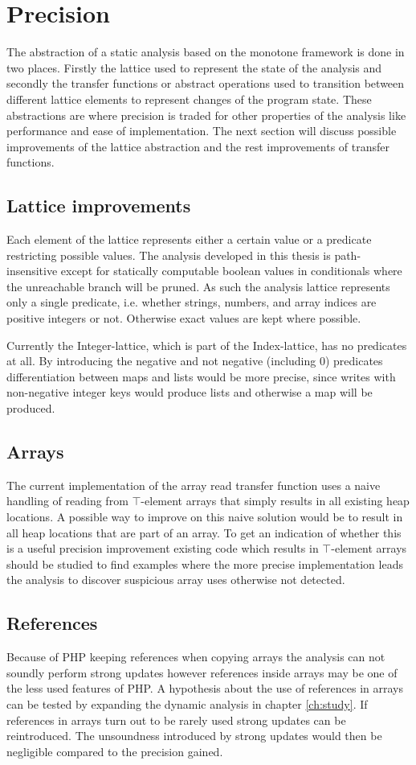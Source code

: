 \section{Precision}
\label{sec:future2}
The abstraction of a static analysis based on the monotone framework is done in two places. Firstly the lattice used to represent the state of the analysis and secondly the transfer functions or abstract operations used to transition between different lattice elements to represent changes of the program state. These abstractions are where precision is traded for other properties of the analysis like performance and ease of implementation. The next section will discuss possible improvements of the lattice abstraction and the rest improvements of transfer functions.

\subsection{Lattice improvements}
Each element of the lattice represents either a certain value or a predicate restricting possible values. The analysis developed in this thesis is path-insensitive except for statically computable boolean values in conditionals where the unreachable branch will be pruned. As such the analysis lattice represents only a single predicate, i.e. whether strings, numbers, and array indices are positive integers or not. Otherwise exact values are kept where possible. 

Currently the Integer-lattice, which is part of the Index-lattice, has no predicates at all. By introducing the negative and not negative (including 0) predicates differentiation between maps and lists would be more precise, since writes with non-negative integer keys would produce lists and otherwise a map will be produced.

\subsection{Arrays}
The current implementation of the array read transfer function uses a naive handling of reading from $\top$-element arrays that simply results in all existing heap locations. A possible way to improve on this naive solution would be to result in all heap locations that are part of an array. To get an indication of whether this is a useful precision improvement existing code which results in $\top$-element arrays should be studied to find examples where the more precise implementation leads the analysis to discover suspicious array uses otherwise not detected.

\subsection{References}
Because of PHP keeping references when copying arrays the analysis can not soundly perform strong updates however references inside arrays may be one of the less used features of PHP. A hypothesis about the use of references in arrays can be tested by expanding the dynamic analysis in chapter \ref{ch:study}. If references in arrays turn out to be rarely used strong updates can be reintroduced. The unsoundness introduced by strong updates would then be negligible compared to the precision gained.